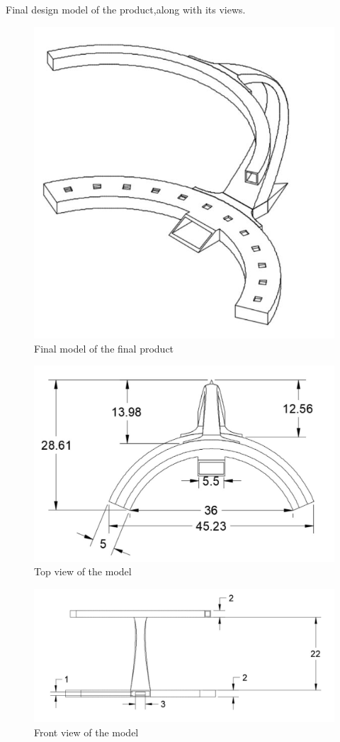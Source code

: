 Final design model of the product,along with its views.
\begin{figure}[h!]
	\centering
 	\includegraphics[width=\textwidth, scale=0.2]{images/2.JPG}
 \caption{Final model of the final product}
\end{figure}
\begin{figure}[h!]
	\centering
 	\includegraphics[width=\textwidth]{images/4.JPG}
 \caption{Top view of the model}
\end{figure}
\begin{figure}[h!]
	\centering
 	\includegraphics[width=\textwidth]{images/3.JPG}
 \caption{Front view of the model}
\end{figure}
